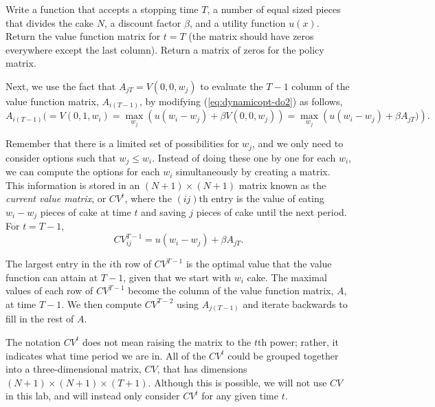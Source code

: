 \begin{problem}
Write a function that accepts a stopping time $T$, a number of equal sized pieces that divides the cake $N$, a discount factor $\beta$, and a utility function $u(x)$.
Return the value function matrix for $t=T$ (the matrix should have zeros everywhere except the last column).
Return a matrix of zeros for the policy matrix.
\label{prob:dynamicopt-eat-cake}
\end{problem}

Next, we use the fact that $A_{jT} = V(0,0,w_j)$ to evaluate the $T-1$ column of the value function matrix, $A_{i(T-1)}$, by modifying  (\ref{eq:dynamicopt-do2}) as follows,
\begin{equation}\label{eq:dynamicopt-do3}
A_{i(T-1)}( = V(0, 1, w_{i}) = \max_{w_j}\left(u(w_{i} - w_{j}) + \beta V(0,0,w_{j})\right) = \max_{w_j}\left(u(w_{i} - w_{j}) + \beta A_{jT})\right).
\end{equation}

Remember that there is a limited set of possibilities for $w_j$, and we only need to consider options such that $w_j \leq w_i$.
Instead of doing these one by one for each $w_i$, we can compute the options for each $w_i$ simultaneously by creating a matrix.
This information is stored in an $(N+1) \times (N+1)$ matrix known as the \emph{current value matrix}, or $CV^t$, where the $(ij)$th entry is the value of eating $w_i-w_j$ pieces of cake at time $t$ and saving $j$ pieces of cake until the next period.
For $t = T-1$,
\begin{equation}\label{eq:dynamicopt-do4}
CV^{T-1}_{ij} = u(w_i - w_j) + \beta A_{jT}.
\end{equation}

The largest entry in the $i$th row of $CV^{T-1}$ is the optimal value that the value function can attain at $T-1$, given that we start with $w_i$ cake.
The maximal values of each row of $CV^{T-1}$ become the column of the value function matrix, $A$, at time $T-1$.
We then compute $CV^{T-2}$ using $A_{j(T-1)}$ and iterate backwards to fill in the rest of $A$.

\begin{warn}
The notation $CV^t$ does not mean raising the matrix to the $t$th power; rather, it indicates what time period we are in.
All of the $CV^t$ could be grouped together into a three-dimensional matrix, $CV$, that has dimensions $(N+1) \times (N+1) \times (T+1)$.
Although this is possible, we will not use $CV$ in this lab, and will instead only consider $CV^t$ for any given time $t$.
\end{warn}

